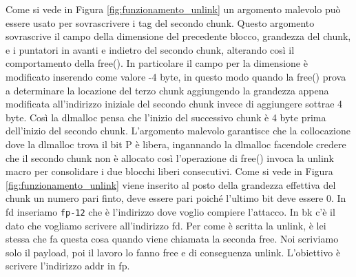 Come si vede in Figura \ref{fig:funzionamento_unlink} un argomento malevolo può essere
usato per sovrascrivere i tag del secondo chunk. Questo argomento sovrascrive il
campo della dimensione del precedente blocco, grandezza del chunk, e i puntatori in
avanti e indietro del secondo chunk, alterando così il comportamento della free().
In particolare il campo per la dimensione è modificato inserendo come valore -4 byte,
in questo modo quando la free() prova a determinare la locazione del terzo chunk
aggiungendo la grandezza appena modificata all'indirizzo iniziale del secondo chunk
invece di aggiungere sottrae 4 byte. Così la dlmalloc pensa che l'inizio del successivo
chunk è 4 byte prima dell'inizio del secondo chunk. L'argomento malevolo garantisce
che la collocazione dove la dlmalloc trova il bit P è libera, ingannando la dlmalloc
facendole credere che il secondo chunk non è allocato così l'operazione di free()
invoca la unlink macro per consolidare i due blocchi liberi consecutivi. Come si vede
in Figura \ref{fig:funzionamento_unlink} viene inserito al posto della grandezza
effettiva del chunk un numero pari finto, deve essere pari poiché l'ultimo bit deve
essere 0.  In fd inseriamo \verb|fp-12| che è l'indirizzo dove voglio compiere l'attacco.
In bk c'è il dato che vogliamo scrivere all'indirizzo fd.
Per come è scritta la unlink, è lei stessa che fa questa cosa quando viene chiamata
la seconda free.
Noi scriviamo solo il payload, poi il lavoro lo fanno free e di conseguenza unlink.
L'obiettivo è scrivere l'indirizzo addr in fp.

